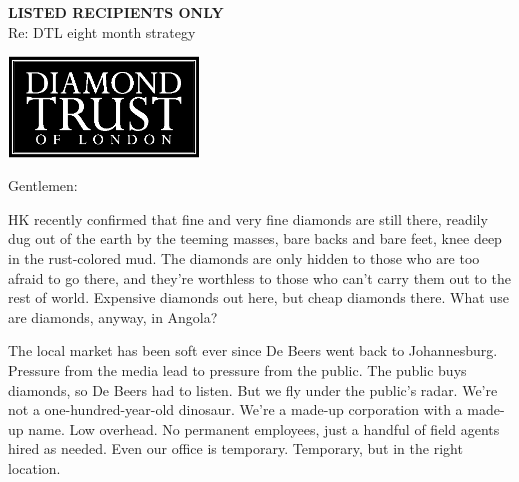 \documentclass[12pt]{letter}
\begin{document}
\begin{letter}{{\bf LISTED RECIPIENTS ONLY}\\ \vspace{0.25in} Re: DTL eight month strategy}

\vspace*{-1.0in}
\begin{center}
\includegraphics[width=2in]{../logo_withFonts.eps}
\end{center}

\vspace*{-1.25in}

\address{
14 Greville St\\
Suite 77\\
London\\
EC1N 8BQ\\
UK\\
\\
+44 (0)20 7327 3080}

\date{May 2, 2000}

\signature{Jason Rohrer\\Acting President\\Diamond Trust of London}


\opening{Gentlemen:}

HK recently confirmed that fine and very fine diamonds are still there, readily dug out of the earth by the teeming masses, bare backs and bare feet, knee deep in the rust-colored mud.  The diamonds are only hidden to those who are too afraid to go there, and they're worthless to those who can't carry them out to the rest of world.  Expensive diamonds out here, but cheap diamonds there.  What use are diamonds, anyway, in Angola?

The local market has been soft ever since De Beers went back to Johannesburg.   Pressure from the media lead to pressure from the public.  The public buys diamonds, so De Beers had to listen.  But we fly under the public's radar.  We're not a one-hundred-year-old dinosaur.  We're a made-up corporation with a made-up name.  Low overhead.  No permanent employees, just a handful of field agents hired as needed.  Even our office is temporary.  Temporary, but in the right location.  %


\end{letter}
\end{document}
